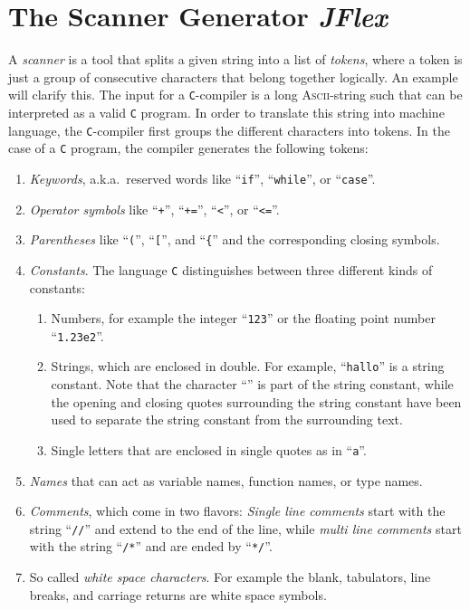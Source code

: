 \chapter{The Scanner Generator \textsl{JFlex}}
A  \emph{scanner} is a tool that splits a given string into a list of \emph{tokens}, where a token is
just a group of consecutive characters that belong together logically.  An example will clarify this.  
The input for a \texttt{C}-compiler is a long \textsc{Ascii}-string such that can be interpreted as a
valid \texttt{C} program.  In order to translate this string into machine language, the
\texttt{C}-compiler first groups the different characters into tokens.  In the case of a \texttt{C}
program, the compiler generates the following tokens:
\begin{enumerate}
\item \emph{Keywords}, a.k.a.~reserved words like ``\texttt{if}'', ``\texttt{while}'', or ``\texttt{case}''.
\item \emph{Operator symbols} like ``\texttt{+}'', ``\texttt{+=}'', ``\texttt{<}'', or
      ``\texttt{<=}''. 
\item \emph{Parentheses} like ``\texttt{(}'', ``\texttt{[}'', and ``\texttt{\{}'' and the
      corresponding closing symbols.
\item \emph{Constants}.  The language \texttt{C} distinguishes between three different kinds of constants:
      \begin{enumerate}
      \item Numbers, for example the integer ``\texttt{123}'' or the floating point number ``\texttt{1.23e2}''.
      \item Strings, which are enclosed in double.  For example,
            ``\texttt{hallo}'' is a string constant.  Note that the character
            ``\texttt{}'' is part of the string constant, while the opening and closing
            quotes surrounding the string constant have been used to separate the string constant
            from the surrounding text. 
      \item Single letters that are enclosed in single quotes as in
            ``\texttt{a}''.
      \end{enumerate}
\item \emph{Names} that can act as variable names, function names, or type names.
\item \emph{Comments}, which come in two flavors:  \emph{Single line comments} start with the string
      ``\texttt{//}'' and extend to the end of the line, while \emph{multi line comments} start with
      the string ``\texttt{/*}'' and are ended by ``\texttt{*/}''.
\item So called \emph{white space characters}.  For example the blank, tabulators, line breaks, and
      carriage returns are white space symbols.
\end{enumerate}

